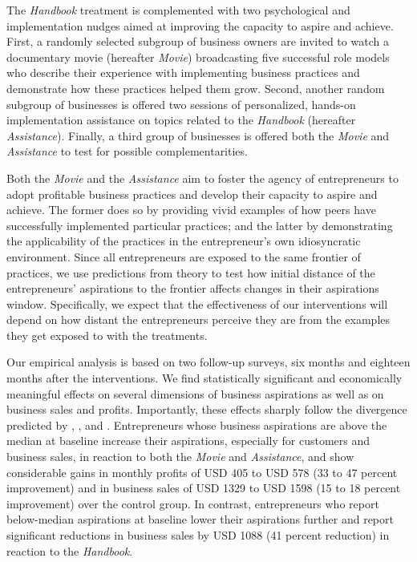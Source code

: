 \documentclass[11.5pt]{article}
\begin{document}

The \emph{Handbook} treatment is complemented with two psychological and implementation nudges aimed at improving the capacity to aspire and achieve. First, a randomly selected subgroup of business owners are invited to watch a documentary movie (hereafter \emph{Movie}) broadcasting five successful role models who describe their experience with implementing business practices and demonstrate how these practices helped them grow. 
Second, another random subgroup of businesses is offered two sessions of personalized, hands-on implementation assistance on topics related to the \emph{Handbook} (hereafter \emph{Assistance}). Finally, a third group of businesses is offered both the \emph{Movie} and \emph{Assistance} to test for possible complementarities.

Both the \emph{Movie} and the \emph{Assistance} aim to foster the agency of entrepreneurs to adopt profitable business practices and develop their capacity to aspire and achieve. The former does so by providing vivid examples of how peers have successfully implemented particular practices; and the latter by demonstrating the applicability of the practices in the entrepreneur's own idiosyncratic environment. Since all entrepreneurs are exposed to the same frontier of practices, we use predictions from theory to test how initial distance of the entrepreneurs' aspirations to the frontier affects changes in their aspirations window. Specifically, we expect that the effectiveness of our interventions will depend on how distant the entrepreneurs perceive they are from the examples they get exposed to with the treatments.

Our empirical analysis is based on two follow-up surveys, six months and eighteen months after the interventions. We find statistically significant and economically meaningful effects on several dimensions of business aspirations as well as on business sales and profits. Importantly, these effects sharply follow the divergence predicted by \citet{Ray2006}, \citet{Genicot2017}, and \citet{Dalton2016}. Entrepreneurs whose business aspirations are above the median at baseline increase their aspirations, especially for customers and business sales, in reaction to both the \emph{Movie} and \emph{Assistance}, and show considerable gains in monthly profits of USD 405 to USD 578 (33 to 47 percent improvement) and in business sales of USD 1329 to USD 1598 (15 to 18 percent improvement) over the control group. In contrast, entrepreneurs who report below-median aspirations at baseline lower their aspirations further and report significant reductions in business sales by USD 1088 (41 percent reduction) in reaction to the \emph{Handbook}. 
\end{document}
